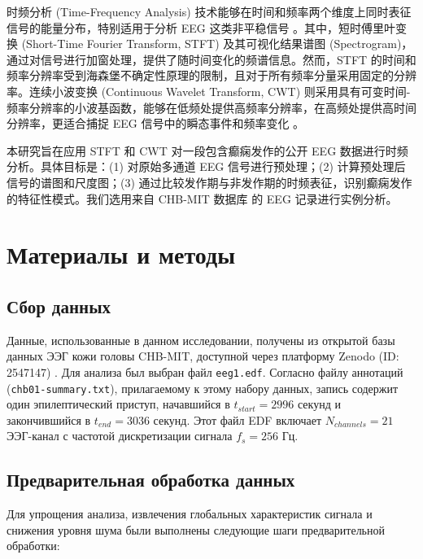 \documentclass{article}
\providecommand{\pcsync}{\par\vspace{\baselineskip}} %
\begin{document}
\begin{paracol}{2}
时频分析 (Time-Frequency Analysis) 技术能够在时间和频率两个维度上同时表征信号的能量分布，特别适用于分析 EEG 这类非平稳信号 \cite{Cohen1995}。其中，短时傅里叶变换 (Short-Time Fourier Transform, STFT) 及其可视化结果谱图 (Spectrogram)，通过对信号进行加窗处理，提供了随时间变化的频谱信息。然而，STFT 的时间和频率分辨率受到海森堡不确定性原理的限制，且对于所有频率分量采用固定的分辨率。连续小波变换 (Continuous Wavelet Transform, CWT) 则采用具有可变时间-频率分辨率的小波基函数，能够在低频处提供高频率分辨率，在高频处提供高时间分辨率，更适合捕捉 EEG 信号中的瞬态事件和频率变化 \cite{Torrence1998}。

本研究旨在应用 STFT 和 CWT 对一段包含癫痫发作的公开 EEG 数据进行时频分析。具体目标是：(1) 对原始多通道 EEG 信号进行预处理；(2) 计算预处理后信号的谱图和尺度图；(3) 通过比较发作期与非发作期的时频表征，识别癫痫发作的特征性模式。我们选用来自 CHB-MIT 数据库 \cite{Shoeb2009} 的 EEG 记录进行实例分析。
\switchcolumn* %

\section{Материалы и методы}
\pcsync

\subsection{Сбор данных} %
Данные, использованные в данном исследовании, получены из открытой базы данных ЭЭГ кожи головы CHB-MIT, доступной через платформу Zenodo (ID: 2547147) \cite{Shoeb2009}. Для анализа был выбран файл \texttt{eeg1.edf}. Согласно файлу аннотаций (\texttt{chb01-summary.txt}), прилагаемому к этому набору данных, запись содержит один эпилептический приступ, начавшийся в $t_{start} = 2996$ секунд и закончившийся в $t_{end} = 3036$ секунд. Этот файл EDF включает $N_{channels} = 21$ ЭЭГ-канал с частотой дискретизации сигнала $f_s = 256$ Гц. %

\subsection{Предварительная обработка данных} %

Для упрощения анализа, извлечения глобальных характеристик сигнала и снижения уровня шума были выполнены следующие шаги предварительной обработки:


\end{paracol}
\end{document}
